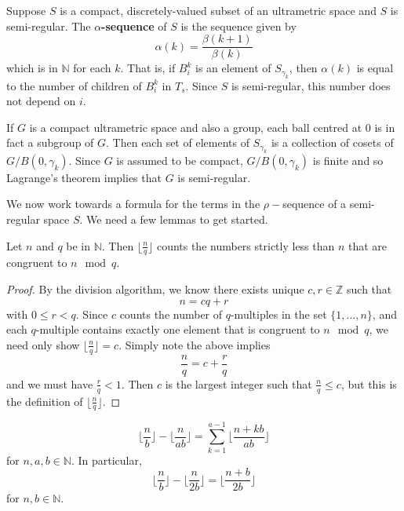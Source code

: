 \begin{definition}
Suppose $S$ is a compact, discretely-valued subset of an ultrametric space and $S$ is semi-regular. The \textbf{$\alpha$-sequence} of $S$ is the sequence given by \[\alpha(k)=\frac{\beta(k+1)}{\beta(k)}\] which is in $\mathbb{N}$ for each $k$. That is, if $B^k_i$ is an element of $S_{\gamma_k}$, then $\alpha(k)$ is equal to the number of children of $B^k_i$ in $T_s$. Since $S$ is semi-regular, this number does not depend on $i$.
\end{definition}

\begin{example}
	If $G$ is a compact ultrametric space and also a group, each ball centred at $0$ is in fact a subgroup of $G$. Then each set of elements of $S_{\gamma_k}$ is a collection of cosets of $G/B(0,\gamma_k)$. Since $G$ is assumed to be compact, $G/B(0,\gamma_k)$ is finite and so Lagrange's theorem implies that $G$ is semi-regular.
\end{example}

We now work towards a formula for the terms in the $\rho-$sequence of a semi-regular space $S$. We need a few lemmas to get started.\\
 
\begin{lemma}
Let $n$ and $q$ be in $\mathbb{N}$. Then $\lfloor\frac{n}{q} \rfloor$ counts the numbers strictly less than $n$ that are congruent to $n \mod q$.
\end{lemma}

\begin{proof}
By the division algorithm, we know there exists unique $c,r \in \mathbb{Z}$ such that \[n = cq + r\] with $0 \leq r < q$. Since $c$ counts the number of $q$-multiples in the set $\{1,\ldots,n\}$, and each $q$-multiple contains exactly one element that is congruent to $n \mod q$, we need only show $\lfloor\frac{n}{q} \rfloor = c$. Simply note the above implies  \[\frac{n}{q} = c + \frac{r}{q}\] and we must have   $\frac{r}{q} < 1$. Then $c$ is the largest integer such that $\frac{n}{q} \leq c$, but this is the definition of $\lfloor\frac{n}{q} \rfloor$.
\end{proof}


\begin{lemma}
\label{semi-regular formula}
\[\lfloor\frac{n}{b} \rfloor - \lfloor \frac{n}{ab} \rfloor = \sum_{k=1}^{a-1} \lfloor \frac{n + kb}{ab} \rfloor\] for $n,a,b \in \mathbb{N}$. In particular, 
\[\lfloor\frac{n}{b} \rfloor - \lfloor \frac{n}{2b} \rfloor= \lfloor \frac{n+b}{2b} \rfloor\] for  $n,b \in \mathbb{N}$.
\end{lemma}


